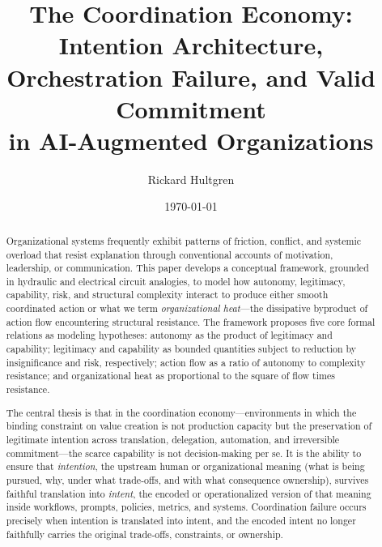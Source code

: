 \documentclass[12pt]{article}
\title{The Coordination Economy: Intention Architecture, \\
Orchestration Failure, and Valid Commitment \\
in AI-Augmented Organizations}
\author{Rickard Hultgren}
\date{\today}
\begin{document}
\maketitle

\begin{abstract}
Organizational systems frequently exhibit patterns of friction, conflict, and systemic
overload that resist explanation through conventional accounts of motivation, leadership,
or communication. This paper develops a conceptual framework, grounded in hydraulic and
electrical circuit analogies, to model how autonomy, legitimacy, capability, risk, and
structural complexity interact to produce either smooth coordinated action or what we
term \textit{organizational heat}---the dissipative byproduct of action flow encountering
structural resistance. The framework proposes five core formal relations as modeling
hypotheses: autonomy as the product of legitimacy and capability; legitimacy and
capability as bounded quantities subject to reduction by insignificance and risk,
respectively; action flow as a ratio of autonomy to complexity resistance; and
organizational heat as proportional to the square of flow times resistance.

The central thesis is that in the coordination economy---environments in which the
binding constraint on value creation is not production capacity but the preservation of
legitimate intention across translation, delegation, automation, and irreversible
commitment---the scarce capability is not decision-making per se. It is the ability to
ensure that \emph{intention}, the upstream human or organizational meaning (what is being
pursued, why, under what trade-offs, and with what consequence ownership), survives
faithful translation into \emph{intent}, the encoded or operationalized version of that
meaning inside workflows, prompts, policies, metrics, and systems. Coordination failure
occurs precisely when intention is translated into intent, and the encoded intent no
longer faithfully carries the original trade-offs, constraints, or ownership.


\end{abstract}
\end{document}
